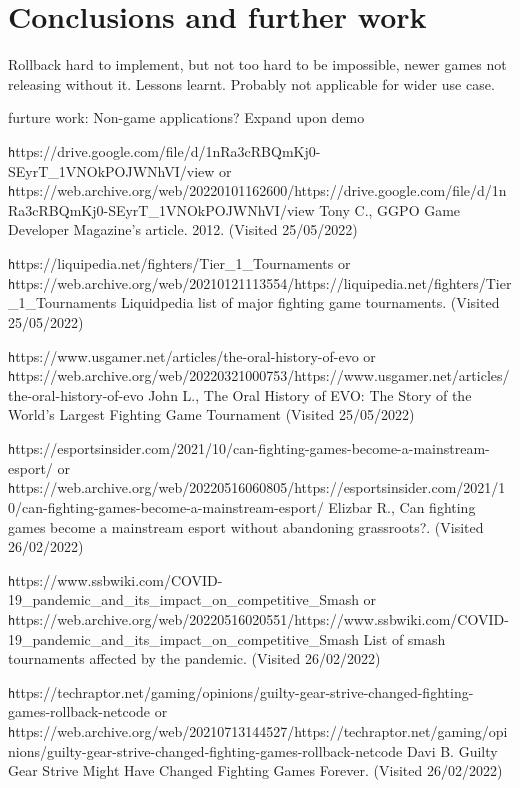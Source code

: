 \documentclass{entcs}
\begin{document}
\section{Conclusions and further work}

Rollback hard to implement, but not too hard to be impossible, newer games not releasing without it. Lessons learnt. Probably not applicable for wider use case. 

furture work: 
Non-game applications? Expand upon demo
\begin{thebibliography}{25}

 {\texttt https://drive.google.com/file/d/1nRa3cRBQmKj0-SEyrT\_1VNOkPOJWNhVI/view} or 
{\texttt https://web.archive.org/web/20220101162600/https://drive.google.com/file/d/1nRa3cRBQmKj0-SEyrT\_1VNOkPOJWNhVI/view} 
Tony C., GGPO Game Developer Magazine's article. 2012. (Visited 25/05/2022)

 {\texttt https://liquipedia.net/fighters/Tier\_1\_Tournaments} or 
{\texttt https://web.archive.org/web/20210121113554/https://liquipedia.net/fighters/Tier\_1\_Tournaments} 
Liquidpedia list of major fighting game tournaments. (Visited 25/05/2022)

 {\texttt https://www.usgamer.net/articles/the-oral-history-of-evo} or 
{\texttt https://web.archive.org/web/20220321000753/https://www.usgamer.net/articles/the-oral-history-of-evo} 
John L., The Oral History of EVO: The Story of the World's Largest Fighting Game Tournament (Visited 25/05/2022)

 {\texttt https://esportsinsider.com/2021/10/can-fighting-games-become-a-mainstream-esport/} or 
{\texttt https://web.archive.org/web/20220516060805/https://esportsinsider.com/2021/10/can-fighting-games-become-a-mainstream-esport/} 
Elizbar R., Can fighting games become a mainstream esport without abandoning grassroots?. (Visited 26/02/2022) 

 {\texttt https://www.ssbwiki.com/COVID-19\_pandemic\_and\_its\_impact\_on\_competitive\_Smash} or {\texttt https://web.archive.org/web/20220516020551/https://www.ssbwiki.com/COVID-19\_pandemic\_and\_its\_impact\_on\_competitive\_Smash} List of smash tournaments affected by the pandemic. (Visited 26/02/2022) 

 {\texttt https://techraptor.net/gaming/opinions/guilty-gear-strive-changed-fighting-games-rollback-netcode} or {\texttt https://web.archive.org/web/20210713144527/https://techraptor.net/gaming/opinions/guilty-gear-strive-changed-fighting-games-rollback-netcode} Davi B. Guilty Gear Strive Might Have Changed Fighting Games Forever. (Visited 26/02/2022)


\end{thebibliography}
\end{document}

